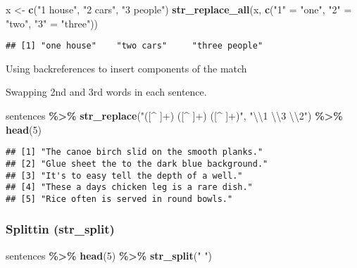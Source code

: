 \documentclass[
]{article}
\newenvironment{Shaded}{\begin{snugshade}}{\end{snugshade}}
\newcommand{\CharTok}[1]{\textcolor[rgb]{0.31,0.60,0.02}{#1}}
\newcommand{\DecValTok}[1]{\textcolor[rgb]{0.00,0.00,0.81}{#1}}
\newcommand{\KeywordTok}[1]{\textcolor[rgb]{0.13,0.29,0.53}{\textbf{#1}}}
\newcommand{\NormalTok}[1]{#1}
\newcommand{\OperatorTok}[1]{\textcolor[rgb]{0.81,0.36,0.00}{\textbf{#1}}}
\newcommand{\StringTok}[1]{\textcolor[rgb]{0.31,0.60,0.02}{#1}}
\begin{document}
\begin{Shaded}
\begin{Highlighting}[]
\NormalTok{x \textless{}{-}}\StringTok{ }\KeywordTok{c}\NormalTok{(}\StringTok{"1 house"}\NormalTok{, }\StringTok{"2 cars"}\NormalTok{, }\StringTok{"3 people"}\NormalTok{)}
\KeywordTok{str\_replace\_all}\NormalTok{(x, }\KeywordTok{c}\NormalTok{(}\StringTok{"1"}\NormalTok{ =}\StringTok{ "one"}\NormalTok{, }\StringTok{"2"}\NormalTok{ =}\StringTok{ "two"}\NormalTok{, }\StringTok{"3"}\NormalTok{ =}\StringTok{ "three"}\NormalTok{))}
\end{Highlighting}
\end{Shaded}

\begin{verbatim}
## [1] "one house"    "two cars"     "three people"
\end{verbatim}

Using backreferences to insert components of the match

Swapping 2nd and 3rd words in each sentence.

\begin{Shaded}
\begin{Highlighting}[]
\NormalTok{sentences }\OperatorTok{\%\textgreater{}\%}
\KeywordTok{str\_replace}\NormalTok{(}\StringTok{"([\^{} ]+) ([\^{} ]+) ([\^{} ]+)"}\NormalTok{, }\StringTok{"}\CharTok{\textbackslash{}\textbackslash{}}\StringTok{1 }\CharTok{\textbackslash{}\textbackslash{}}\StringTok{3 }\CharTok{\textbackslash{}\textbackslash{}}\StringTok{2"}\NormalTok{) }\OperatorTok{\%\textgreater{}\%}
\KeywordTok{head}\NormalTok{(}\DecValTok{5}\NormalTok{)}
\end{Highlighting}
\end{Shaded}

\begin{verbatim}
## [1] "The canoe birch slid on the smooth planks." 
## [2] "Glue sheet the to the dark blue background."
## [3] "It's to easy tell the depth of a well."     
## [4] "These a days chicken leg is a rare dish."   
## [5] "Rice often is served in round bowls."
\end{verbatim}

\hypertarget{splittin-str_split}{%
\subsubsection{Splittin (str\_split)}\label{splittin-str_split}}

\begin{Shaded}
\begin{Highlighting}[]
\NormalTok{sentences }\OperatorTok{\%\textgreater{}\%}
\KeywordTok{head}\NormalTok{(}\DecValTok{5}\NormalTok{) }\OperatorTok{\%\textgreater{}\%}
\KeywordTok{str\_split}\NormalTok{(}\StringTok{" "}\NormalTok{)}
\end{Highlighting}
\end{Shaded}
\end{document}
